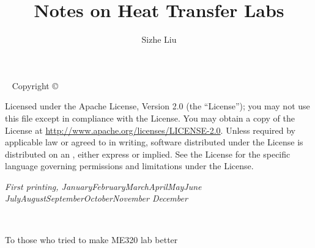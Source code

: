 \documentclass[notoc,numbers,openany,UTF8]{tufte-book}
\title{Notes on Heat Transfer Labs}
\author[Sizhe Liu]{Sizhe Liu}
\newcommand{\monthyear}{%
  \ifcase\month\or January\or February\or March\or April\or May\or June\or
  July\or August\or September\or October\or November\or
  December\fi\space\number\year
}
\begin{document}
\frontmatter
\maketitle

\newpage
\begin{fullwidth}
~\vfill
\thispagestyle{empty}
\setlength{\parindent}{0pt}
\setlength{\parskip}{\baselineskip}
Copyright \copyright\ \the\year\ \thanklessauthor



\par Licensed under the Apache License, Version 2.0 (the ``License''); you may not
use this file except in compliance with the License. You may obtain a copy
of the License at \url{http://www.apache.org/licenses/LICENSE-2.0}. Unless
required by applicable law or agreed to in writing, software distributed
under the License is distributed on an , either express or implied. See the
License for the specific language governing permissions and limitations
under the License.

\par\textit{First printing, \monthyear}
\end{fullwidth}

\begin{fullwidth}
\tableofcontents

\listoffigures

\listoftables
\end{fullwidth}

\cleardoublepage
\markboth{}{}
~\vfill
\begin{doublespace}
\noindent\fontsize{18}{22}\selectfont\itshape
\nohyphenation
\begin{fullwidth}
To those who tried to make ME320 lab better
\end{fullwidth}
\end{doublespace}
\vfill
\vfill


\mainmatter





\backmatter

\begin{fullwidth}
	
\end{fullwidth}


\printindex
\end{document}
